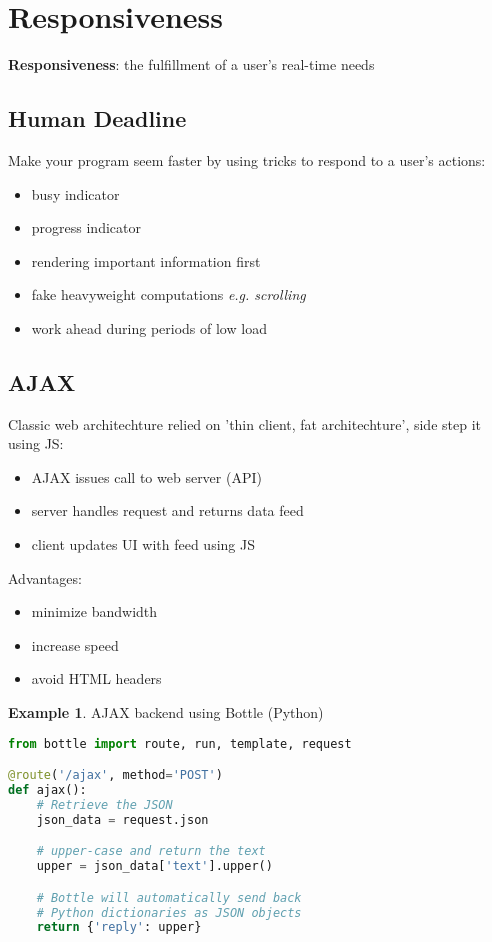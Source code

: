 \documentclass[]{article}
\theoremstyle{definition}
\newtheorem{ex}{Example}[section]
\begin{document}
			\section{Responsiveness}
				\textbf{Responsiveness}: the fulfillment of a user's real-time needs
				\subsection{Human Deadline}
					Make your program seem faster by using tricks to respond to a user's actions:
					\begin{itemize}
						\item busy indicator
						\item progress indicator
						\item rendering important information first
						\item fake heavyweight computations \textit{e.g. scrolling}
						\item work ahead during periods of low load
					\end{itemize}
				\subsection{AJAX}
					Classic web architechture relied on	'thin client, fat architechture', side step it using JS:
					\begin{itemize}
						\item AJAX issues call to web server (API)
						\item server handles request and returns data feed 
						\item client updates UI with feed using JS
					\end{itemize}
					Advantages:
					\begin{itemize}
						\item minimize bandwidth
						\item increase speed
						\item avoid HTML headers 
					\end{itemize}
					\begin{ex}
						AJAX backend using Bottle (Python)
						\begin{lstlisting}[language=Python]
from bottle import route, run, template, request

@route('/ajax', method='POST')
def ajax():
	# Retrieve the JSON
	json_data = request.json

	# upper-case and return the text
	upper = json_data['text'].upper()

	# Bottle will automatically send back
	# Python dictionaries as JSON objects
	return {'reply': upper}
						\end{lstlisting}
					\end{ex}
\end{document}
